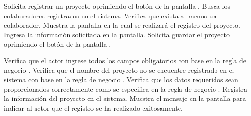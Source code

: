  \begin{UCtrayectoria}
    \UCpaso[\UCactor] Solicita registrar un proyecto oprimiendo el botón  de la pantalla .
    \UCpaso[\UCsist] Busca los colaboradores registrados en el sistema. 
    \UCpaso[\UCsist] Verifica que exista al menos un colaborador. 
    \UCpaso[\UCsist] Muestra la pantalla  en la cual se realizará el registro del proyecto. 
    \UCpaso[\UCactor] Ingresa la información solicitada en la pantalla. \label{cu1.1:ingresaDatos}
    \UCpaso[\UCactor] Solicita guardar el proyecto oprimiendo el botón  de la pantalla .  
    
    \UCpaso[\UCsist] Verifica que el actor ingrese todos los campos obligatorios con base en la regla de negocio  . 
    \UCpaso[\UCsist] Verifica que el nombre del proyecto no se encuentre registrado en el sistema con base en la regla de negocio  . 
    \UCpaso[\UCsist] Verifica que los datos requeridos sean proporcionados correctamente como se especifica en la regla de negocio .  
    \UCpaso[\UCsist] Registra la información del proyecto en el sistema.
    \UCpaso[\UCsist] Muestra el mensaje  en la pantalla 
    para indicar al actor que el registro se ha realizado exitosamente.
 \end{UCtrayectoria}

